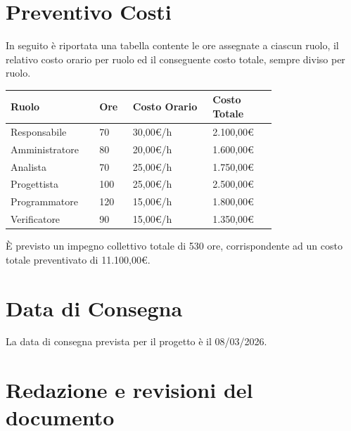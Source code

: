 \documentclass[a4paper,12pt]{article}
\begin{document}
\section{Preventivo Costi}
In seguito è riportata una tabella contente le ore assegnate a ciascun ruolo, il relativo costo orario per ruolo ed il conseguente costo totale, sempre diviso per ruolo.
\begin{center}
    \small
    \renewcommand{\arraystretch}{1.2} 
    \begin{tabular}{|p{0.20\linewidth}|p{0.10\linewidth}|p{0.25\linewidth}|p{0.20\linewidth}|}
        \hline
        \rowcolor{gray!60} 
        \textbf{Ruolo} & \textbf{Ore} & \textbf{Costo Orario} & \textbf{Costo Totale} \\
        \hline
        \rowcolor{white}
        Responsabile & 70 & 30,00€/h & 2.100,00€\\
        \hline
        \rowcolor{gray!20}
        Amministratore & 80 & 20,00€/h & 1.600,00€\\
        \hline
        \rowcolor{white}
        Analista & 70 & 25,00€/h & 1.750,00€\\
        \hline
        \rowcolor{gray!20}
        Progettista & 100 & 25,00€/h & 2.500,00€\\
        \hline
        \rowcolor{white}
        Programmatore & 120 & 15,00€/h & 1.800,00€\\
        \hline
        \rowcolor{gray!20}
        Verificatore & 90 & 15,00€/h & 1.350,00€\\
        \hline
    \end{tabular}
\end{center}
È previsto un impegno collettivo totale di 530 ore, corrispondente ad un costo totale preventivato di 11.100,00€. 

\section{Data di Consegna}
La data di consegna prevista per il progetto è il 08/03/2026.

\clearpage
\section{Redazione e revisioni del documento}
\end{document}
